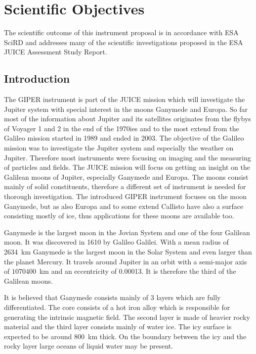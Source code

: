  
\section{Scientific Objectives}

The scientific outcome of this instrument proposal is in accordance
with ESA \ac{SciRD}\cite{yellowbook} and addresses many of the scientific
investigations proposed in the ESA JUICE Assessment Study Report\cite{yellowbook}.


\subsection{Introduction \label{sub:Introduction-science}}

The GIPER instrument is part of the JUICE mission which will investigate
the Jupiter system with special interest in the moons Ganymede and
Europa. So far most of the information about Jupiter and its satellites
originates from the flybys of Voyager 1 and 2 in the end of the 1970ies
and to the most extend from the Galileo mission started in 1989 and
ended in 2003. The objective of the Galileo mission was to investigate
the Jupiter system and especially the weather on Jupiter. Therefore
most instruments were focusing on imaging and the measuring of particles
and fields. The JUICE mission will focus on getting an insight on
the Galilean moons of Jupiter, especially Ganymede and Europa. The
moons consist mainly of solid constituents, therefore a different
set of instrument is needed for thorough investigation. The introduced
GIPER instrument focuses on the moon Ganymede, but as also Europa
and to some extend Callisto have also a surface consisting mostly
of ice, thus applications for these moons are available too.

Ganymede is the largest moon in the Jovian System and one of the four
Galilean moon. It was discovered in 1610 by Galileo Galilei. With
a mean radius of 2634~km Ganymede is the largest moon in the Solar
System and even larger than the planet Mercury. It travels around
Jupiter in an orbit with a semi-major axis of $1070400$~km and an
eccentricity of 0.00013. It is therefore the third of the Galilean
moons\cite{pater2010planetary}. 

It is believed that Ganymede consists mainly of 3 layers which are
fully differentiated. The core consists of a hot iron alloy which
is responsible for generating the intrinsic magnetic field. The second
layer is made of heavier rocky material and the third layer consists
mainly of water ice. The icy surface is expected to be around 800~km
thick. On the boundary between the icy and the rocky layer large oceans
of liquid water may be present\cite{bagenal2007jupiter}.


